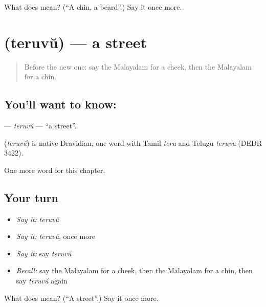 \begin{tcolorbox}[breakable,colback=teal!4,colframe=teal!35!black,title={Before you move on}]
What does  mean? (\textquotedblleft{}A chin, a beard\textquotedblright{}.) Say it once more.
\end{tcolorbox}
\section[\texorpdfstring{\ml{തെരുവ്} (teruvŭ)}{തെരുവ് (teruvŭ)}]{ (teruvŭ) — a street}

\label{lesson:ML-C155-teruvu}



\begin{quote}
Before the new one: say the Malayalam for a cheek, then the Malayalam for a chin.
\end{quote}

\subsection*{You'll want to know: }
\textbf{} — \emph{teruvŭ} — \textquotedblleft{}a street\textquotedblright{}.

\begin{cousinweb}
\textbf{} (\emph{teruvŭ}) is native Dravidian, one word with Tamil \emph{teru} and Telugu \emph{teruvu} (DEDR 3422).
\end{cousinweb}

\begin{grammarlens}[title={What you've built}]
One more word for this chapter.
\end{grammarlens}

\subsection*{Your turn}
\begin{itemize}
\raggedright
  \item \emph{Say it:} \emph{teruvŭ}
  \item \emph{Say it:} \emph{teruvŭ}, once more
  \item \emph{Say it:} say \emph{teruvŭ}
  \item \emph{Recall:} say the Malayalam for a cheek, then the Malayalam for a chin, then say \emph{teruvŭ} again
\end{itemize}

\begin{tcolorbox}[breakable,colback=teal!4,colframe=teal!35!black,title={Before you move on}]
What does  mean? (\textquotedblleft{}A street\textquotedblright{}.) Say it once more.
\end{tcolorbox}
